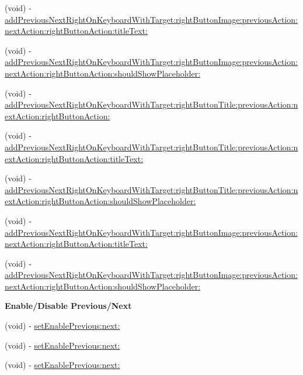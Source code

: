 \begin{Indent}
\begin{DoxyCompactItemize}
\item 
(void) -\/ \mbox{\hyperlink{category_u_i_view_07_i_q_toolbar_addition_08_a26f6b992bacc26df65c0db912256351f}{add\+Previous\+Next\+Right\+On\+Keyboard\+With\+Target\+:right\+Button\+Image\+:previous\+Action\+:next\+Action\+:right\+Button\+Action\+:title\+Text\+:}}
\item 
(void) -\/ \mbox{\hyperlink{category_u_i_view_07_i_q_toolbar_addition_08_a204ed32ccf6ac66e9db3fa2e4bb2c76c}{add\+Previous\+Next\+Right\+On\+Keyboard\+With\+Target\+:right\+Button\+Image\+:previous\+Action\+:next\+Action\+:right\+Button\+Action\+:should\+Show\+Placeholder\+:}}
\item 
(void) -\/ \mbox{\hyperlink{category_u_i_view_07_i_q_toolbar_addition_08_a4d1d6706d9364e84989f7353f606d2f9}{add\+Previous\+Next\+Right\+On\+Keyboard\+With\+Target\+:right\+Button\+Title\+:previous\+Action\+:next\+Action\+:right\+Button\+Action\+:}}
\item 
(void) -\/ \mbox{\hyperlink{category_u_i_view_07_i_q_toolbar_addition_08_a3541643bf32fe3b256737bc4357c07ab}{add\+Previous\+Next\+Right\+On\+Keyboard\+With\+Target\+:right\+Button\+Title\+:previous\+Action\+:next\+Action\+:right\+Button\+Action\+:title\+Text\+:}}
\item 
(void) -\/ \mbox{\hyperlink{category_u_i_view_07_i_q_toolbar_addition_08_aeda24f2aeec3c3f38bd8d02494677b70}{add\+Previous\+Next\+Right\+On\+Keyboard\+With\+Target\+:right\+Button\+Title\+:previous\+Action\+:next\+Action\+:right\+Button\+Action\+:should\+Show\+Placeholder\+:}}
\item 
(void) -\/ \mbox{\hyperlink{category_u_i_view_07_i_q_toolbar_addition_08_a26f6b992bacc26df65c0db912256351f}{add\+Previous\+Next\+Right\+On\+Keyboard\+With\+Target\+:right\+Button\+Image\+:previous\+Action\+:next\+Action\+:right\+Button\+Action\+:title\+Text\+:}}
\item 
(void) -\/ \mbox{\hyperlink{category_u_i_view_07_i_q_toolbar_addition_08_a204ed32ccf6ac66e9db3fa2e4bb2c76c}{add\+Previous\+Next\+Right\+On\+Keyboard\+With\+Target\+:right\+Button\+Image\+:previous\+Action\+:next\+Action\+:right\+Button\+Action\+:should\+Show\+Placeholder\+:}}
\end{DoxyCompactItemize}
\end{Indent}
\begin{Indent}\textbf{ Enable/\+Disable Previous/\+Next}\par
{\em 

 

 }\begin{DoxyCompactItemize}
\item 
(void) -\/ \mbox{\hyperlink{category_u_i_view_07_i_q_toolbar_addition_08_af67c004fb5a380228b408ec07c9eca2c}{set\+Enable\+Previous\+:next\+:}}
\item 
(void) -\/ \mbox{\hyperlink{category_u_i_view_07_i_q_toolbar_addition_08_af67c004fb5a380228b408ec07c9eca2c}{set\+Enable\+Previous\+:next\+:}}
\item 
(void) -\/ \mbox{\hyperlink{category_u_i_view_07_i_q_toolbar_addition_08_af67c004fb5a380228b408ec07c9eca2c}{set\+Enable\+Previous\+:next\+:}}
\end{DoxyCompactItemize}
\end{Indent}
